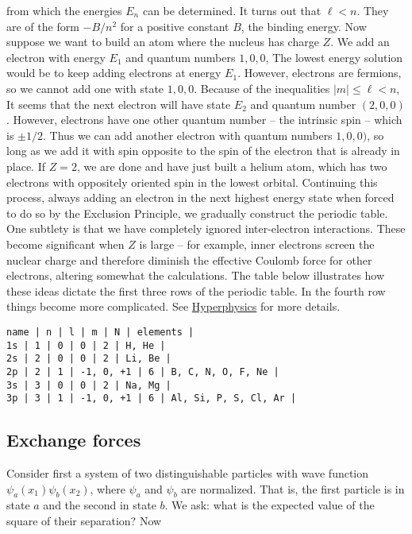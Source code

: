 from which the energies $E_n$ can be determined.  It turns out that $\ell < n$.  They are of the form $-B/n^2$ for a positive constant $B$, the binding energy.  Now suppose we want to build an atom where the nucleus has charge $Z$.  We add an electron with energy $E_1$ and quantum numbers $1,0,0$, The lowest energy solution would be to keep adding electrons at energy $E_1$.  However, electrons are fermions, so we cannot add one with state $1,0,0$.  Because of the inequalities $|m| \le \ell < n$, It seems that the next electron will have state $E_2$ and quantum number $(2,0,0)$. However, electrons have one other quantum number -- the intrinsic spin -- which is $\pm1/2$.  Thus we can add another electron with quantum numbers $1,0,0)$, so long as we add it with spin opposite to the spin of the electron that is already in place.  If $Z = 2$, we are done and have just built a helium atom, which has two electrons with oppositely oriented spin in the lowest orbital.  Continuing this process, always adding an electron in the next highest energy state when forced to do so by the Exclusion Principle, we gradually construct the periodic table.  One subtlety is that we have completely ignored inter-electron interactions.  These become significant when $Z$ is large -- for example, inner electrons screen the nuclear charge and therefore diminish the effective Coulomb force for other electrons, altering somewhat the calculations. The table below illustrates how these ideas dictate the first three rows of the periodic table. In the fourth row things become more complicated.  See \href{http://hyperphysics.phy-astr.gsu.edu/hbase/chemical/eleorb.html}{Hyperphysics} for more details.

\begin{verbatim}
name | n | l | m | N | elements |
1s | 1 | 0 | 0 | 2 | H, He |
2s | 2 | 0 | 0 | 2 | Li, Be |
2p | 2 | 1 | -1, 0, +1 | 6 | B, C, N, O, F, Ne |
3s | 3 | 0 | 0 | 2 | Na, Mg |
3p | 3 | 1 | -1, 0, +1 | 6 | Al, Si, P, S, Cl, Ar |
\end{verbatim}

\subsection{Exchange forces}

Consider first a system of two distinguishable particles with wave function $\psi_a(x_1)\psi_b(x_2)$, where $\psi_a$ and $\psi_b$ are normalized.  That is, the first particle is in state $a$ and the second in state $b$.  We ask: what is the expected value of the square of their separation?  Now

